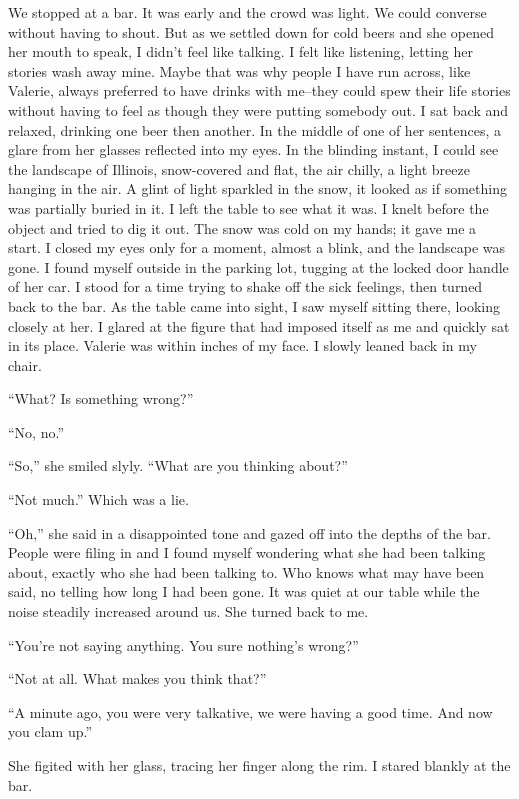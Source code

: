 We stopped at a bar. It was early and the crowd was light. We could
converse without having to shout. But as we settled down for cold beers
and she opened her mouth to speak, I didn't feel like talking. I felt
like listening, letting her stories wash away mine. Maybe that was why
people I have run across, like Valerie, always preferred to have drinks
with me--they could spew their life stories without having to feel as
though they were putting somebody out. I sat back and relaxed, drinking
one beer then another. In the middle of one of her sentences, a glare
from her glasses reflected into my eyes. In the blinding instant, I
could see the landscape of Illinois, snow-covered and flat, the air
chilly, a light breeze hanging in the air. A glint of light sparkled in
the snow, it looked as if something was partially buried in it. I left
the table to see what it was. I knelt before the object and tried to dig
it out. The snow was cold on my hands; it gave me a start. I closed my
eyes only for a moment, almost a blink, and the landscape was gone. I
found myself outside in the parking lot, tugging at the locked door
handle of her car. I stood for a time trying to shake off the sick
feelings, then turned back to the bar. As the table came into sight, I
saw myself sitting there, looking closely at her. I glared at the figure
that had imposed itself as me and quickly sat in its place. Valerie was
within inches of my face. I slowly leaned back in my chair.

``What? Is something wrong?''

``No, no.''

``So,'' she smiled slyly. ``What are you thinking about?''

``Not much.'' Which was a lie.

``Oh,'' she said in a disappointed tone and gazed off into the depths of
the bar. People were filing in and I found myself wondering what she had
been talking about, exactly who she had been talking to. Who knows what
may have been said, no telling how long I had been gone. It was quiet at
our table while the noise steadily increased around us. She turned back
to me.

``You're not saying anything. You sure nothing's wrong?''

``Not at all. What makes you think that?''

``A minute ago, you were very talkative, we were having a good time. And
now you clam up.''

She figited with her glass, tracing her finger along the rim. I stared
blankly at the bar.

